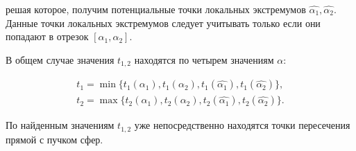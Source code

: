 \documentclass[a4paper,10pt]{extarticle}                     %
\numberwithin{equation}{section}                             %
\numberwithin{figure}{section}                               %
\theoremstyle{plain}                                         %
\begin{document}
решая которое, получим потенциальные точки локальных экстремумов $\hat{\alpha_1}, \hat{\alpha_2}$.
Данные точки локальных экстремумов следует учитывать только если они попадают в отрезок $[\alpha_1, \alpha_2]$.

В общем случае значения $t_{1,2}$ находятся по четырем значениям $\alpha$:

\begin{align}
    t_1 = \min\{t_1(\alpha_1), t_1(\alpha_2), t_1(\hat{\alpha_1}), t_1(\hat{\alpha_2})\}, \\
    t_2 = \max\{t_2(\alpha_1), t_2(\alpha_2), t_2(\hat{\alpha_1}), t_2(\hat{\alpha_2})\}.
\end{align}

По найденным значениям $t_{1, 2}$ уже непосредственно находятся точки пересечения прямой с пучком сфер.
\end{document}
